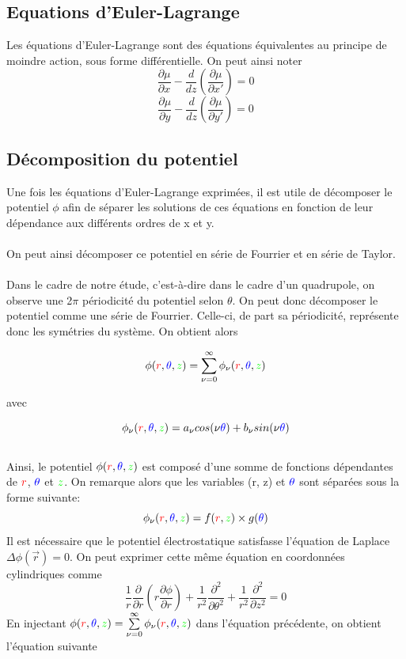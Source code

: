 \documentclass{report}
\begin{document}
\subsection{Equations d'Euler-Lagrange}
Les équations d'Euler-Lagrange sont des équations équivalentes au principe de moindre action, sous forme 
différentielle. On peut ainsi noter 
\[
\frac{\partial \mu }{\partial x}-\frac{d}{dz}\left(\frac{\partial \mu }{\partial x'}\right)=0
\]
\[
\frac{\partial \mu }{\partial y}-\frac{d}{dz}\left(\frac{\partial \mu }{\partial y'}\right)=0
\]

\subsection{Décomposition du potentiel}
Une fois les équations d'Euler-Lagrange exprimées, il est utile de décomposer le potentiel $\phi$ afin de 
séparer les solutions de ces équations en fonction de leur dépendance aux différents ordres de x et y. 
\\
\\
On peut ainsi décomposer ce potentiel en série de Fourrier et en série de Taylor. 
\\
\\
Dans le cadre de notre étude, c'est-à-dire dans le cadre d'un quadrupole, on observe une 2$\pi$ périodicité 
du potentiel selon $\theta$.
On peut donc décomposer le potentiel comme une série de Fourrier. Celle-ci, de part sa périodicité, représente 
donc les symétries du système. On obtient alors 

\[
\phi ({\color{red}r},{\color{blue}\theta},{\color{green}z})=\sum\limits_{\nu =0}^{\infty} \phi_\nu ({\color{red}r},{\color{blue}\theta},{\color{green}z})
\]

avec 

\[
\phi_\nu ({\color{red}r},{\color{blue}\theta},{\color{green}z})=a_\nu cos(\nu{\color{blue}\theta})+b_\nu sin(\nu {\color{blue}\theta})
\]
\\ 
Ainsi, le potentiel $\phi ({\color{red}r},{\color{blue}\theta},{\color{green}z})$ est composé d'une somme de fonctions dépendantes de 
${\color{red}r}$, ${\color{blue}\theta}$ et ${\color{green}z}$. On remarque alors que les variables 
({\color{red}r}, {\color{green}z}) et ${\color{blue}\theta}$ sont séparées sous la forme suivante: 
\[
\phi_\nu ({\color{red}r},{\color{blue}\theta},{\color{green}z})=f({\color{red}r},{\color{green}z})\times g({\color{blue}\theta})
\]
Il est nécessaire que le potentiel électrostatique satisfasse l'équation de Laplace $\Delta \phi(\vec{r})=0$. On peut
exprimer cette même équation en coordonnées cylindriques comme  
\[
\frac{1}{r} \frac{\partial}{\partial r} \left(r \frac{\partial \phi}{\partial r} \right) + \frac{1}{r^2} \frac{\partial^{2}}{\partial \theta ^2}
+ \frac{1}{r^2} \frac{\partial^{2}}{\partial z ^2}=0
\]
En injectant $\phi ({\color{red}r},{\color{blue}\theta},{\color{green}z})=\sum\limits_{\nu =0}^{\infty} \phi_\nu ({\color{red}r},{\color{blue}\theta},{\color{green}z})$
dans l'équation précédente, on obtient l'équation suivante
\end{document}
